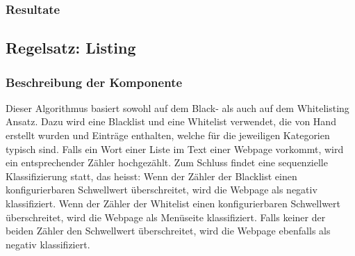 \subsubsection{Resultate}
\subsection{Regelsatz: Listing}
\subsubsection{Beschreibung der Komponente}
Dieser Algorithmus basiert sowohl auf dem Black- als auch auf dem Whitelisting Ansatz.
Dazu wird eine Blacklist und eine Whitelist verwendet, die von Hand erstellt wurden und Einträge enthalten, welche für die jeweiligen Kategorien typisch sind.
Falls ein Wort einer Liste im Text einer Webpage vorkommt, wird ein entsprechender Zähler hochgezählt.
Zum Schluss findet eine sequenzielle Klassifizierung statt, das heisst: 
Wenn der Zähler der Blacklist einen konfigurierbaren Schwellwert überschreitet, wird die Webpage als negativ klassifiziert. 
Wenn der Zähler der Whitelist einen konfigurierbaren Schwellwert überschreitet, wird die Webpage als Menüseite klassifiziert.
Falls keiner der beiden Zähler den Schwellwert überschreitet, wird die Webpage ebenfalls als negativ klassifiziert. 
